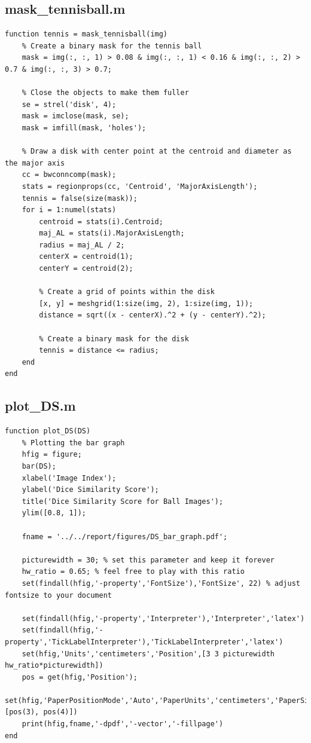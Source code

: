 \documentclass[conference]{IEEEtran}
\begin{document}
        \subsection{mask\_tennisball.m}
            \begin{lstlisting}[style=Matlab-editor, basicstyle=\scriptsize]
function tennis = mask_tennisball(img)
    % Create a binary mask for the tennis ball
    mask = img(:, :, 1) > 0.08 & img(:, :, 1) < 0.16 & img(:, :, 2) > 0.7 & img(:, :, 3) > 0.7;

    % Close the objects to make them fuller
    se = strel('disk', 4);
    mask = imclose(mask, se);
    mask = imfill(mask, 'holes');

    % Draw a disk with center point at the centroid and diameter as the major axis
    cc = bwconncomp(mask);
    stats = regionprops(cc, 'Centroid', 'MajorAxisLength');
    tennis = false(size(mask));
    for i = 1:numel(stats)
        centroid = stats(i).Centroid;
        maj_AL = stats(i).MajorAxisLength;
        radius = maj_AL / 2;
        centerX = centroid(1);
        centerY = centroid(2);
        
        % Create a grid of points within the disk
        [x, y] = meshgrid(1:size(img, 2), 1:size(img, 1));
        distance = sqrt((x - centerX).^2 + (y - centerY).^2);
        
        % Create a binary mask for the disk
        tennis = distance <= radius;     
    end
end
            \end{lstlisting}
        \subsection{plot\_DS.m}
            \begin{lstlisting}[style=Matlab-editor, basicstyle=\scriptsize]
function plot_DS(DS)
    % Plotting the bar graph
    hfig = figure;
    bar(DS);
    xlabel('Image Index');
    ylabel('Dice Similarity Score');
    title('Dice Similarity Score for Ball Images');
    ylim([0.8, 1]);

    fname = '../../report/figures/DS_bar_graph.pdf';

    picturewidth = 30; % set this parameter and keep it forever
    hw_ratio = 0.65; % feel free to play with this ratio
    set(findall(hfig,'-property','FontSize'),'FontSize', 22) % adjust fontsize to your document

    set(findall(hfig,'-property','Interpreter'),'Interpreter','latex') 
    set(findall(hfig,'-property','TickLabelInterpreter'),'TickLabelInterpreter','latex')
    set(hfig,'Units','centimeters','Position',[3 3 picturewidth hw_ratio*picturewidth])
    pos = get(hfig,'Position');
    set(hfig,'PaperPositionMode','Auto','PaperUnits','centimeters','PaperSize',[pos(3), pos(4)])
    print(hfig,fname,'-dpdf','-vector','-fillpage')
end
            \end{lstlisting}
\end{document}
